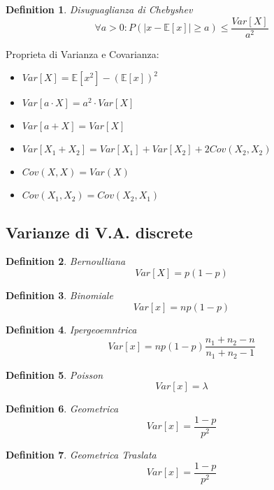 \documentclass{article}
\newtheorem{definition}{Definition}[section]
\begin{document}
    \begin{definition} Disuguaglianza di Chebyshev
        $$
        \forall a > 0: P(|x-\mathbb E[x]| \geq a) \leq \frac{Var[X]}{a^2}
        $$
    \end{definition}

    Proprieta di Varianza e Covarianza:
    \begin{itemize}
        \item $Var[X] = \mathbb E[x^2] - (\mathbb E[x])^2$
        \item $Var[a \cdot X] = a^2 \cdot Var[X]$
        \item $Var[a+X] = Var[X]$
        \item $Var[X_1 + X_2] = Var[X_1] + Var[X_2] + 2 Cov(X_2, X_2)$
        \item $Cov(X,X) = Var(X)$
        \item $Cov(X_1, X_2) = Cov(X_2, X_1)$
    \end{itemize}

    \subsection{Varianze di V.A. discrete}
    \begin{definition} Bernoulliana
        $$
        Var[X] = p(1-p)
        $$
    \end{definition}

    \begin{definition} Binomiale
        $$
        Var[x] = np(1-p)
        $$
    \end{definition}

    \begin{definition} Ipergeoemntrica
        $$
        Var[x] = n p (1-p) \frac{n_1 + n_2 - n}{n_1 + n_2 - 1}
        $$
    \end{definition}

    \begin{definition} Poisson
        $$
        Var[x] = \lambda
        $$
    \end{definition}

    \begin{definition} Geometrica
        $$
        Var[x] = \frac{1-p}{p^2}
        $$
    \end{definition}

    \begin{definition} Geometrica Traslata
        $$
        Var[x] = \frac{1-p}{p^2}
        $$
    \end{definition}
\end{document}
